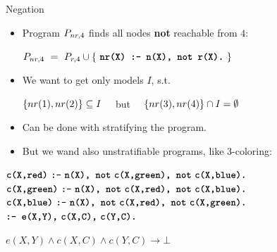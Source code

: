 \documentclass{beamer}
\begin{document}
\begin{frame}{Negation}
	\onslide<+->
	
	\begin{itemize}
		\item Program $P_{nr,4}$ finds all nodes \textbf{not} reachable from $4$:
			\begin{center}
				$\prog_{nr,4} \ = \ \prog_{r,4} \cup \set{\ \code{nr(X) :- n(X), not r(X).}\ }$
			\end{center}
		
		\item We want to get only models $I$, s.t.
			\begin{center}
				$\left\{{nr(1), nr(2)}\right\}\subseteq I\quad$ but $\quad\left\{{nr(3), nr(4)}\right\}\cap I = \emptyset$
			\end{center}
		
		\item Can be done with stratifying the program.
		
		\onslide<+->
		
		\item But we wand also unstratifiable programs, like 3-coloring:
		
	\end{itemize}
	
	
	$\texttt{\bfseries{c(X,red)}}\ \texttt{\bfseries{:-}}\ \texttt{\bfseries{n(X), not}}\ \texttt{\bfseries{c(X,green), not}}\ \texttt{\bfseries{c(X,blue).}}$\\
	$\texttt{\bfseries{c(X,green)}}\ \texttt{\bfseries{:-}}\ \texttt{\bfseries{n(X), not}}\ \texttt{\bfseries{c(X,red), not}}\ \texttt{\bfseries{c(X,blue).}}$\\
	$\texttt{\bfseries{c(X,blue)}}\ \texttt{\bfseries{:-}}\ \texttt{\bfseries{n(X), not}}\ \texttt{\bfseries{c(X,red), not}}\ \texttt{\bfseries{c(X,green).}}$\\
	$\code{:- e(X,Y),}\ \code{c(X,C),}\ \code{c(Y,C).}$
	
	\hspace{1cm}
	{\tiny\color{black!50} $e(X,Y) \wedge c(X,C) \wedge c(Y,C) \rightarrow \bot$}
	
\end{frame}
\end{document}
